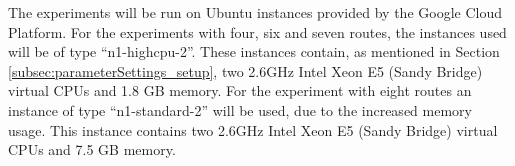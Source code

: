 The experiments will be run on Ubuntu instances provided by the Google Cloud Platform\citep{website:google}. For the experiments with four, six and seven routes, the instances used will be of type ``n1-highcpu-2''. These instances contain, as mentioned in Section \vref{subsec:parameterSettings_setup}, two 2.6GHz Intel Xeon E5 (Sandy Bridge) virtual CPUs and 1.8 GB memory. For the experiment with eight routes an instance of type ``n1-standard-2'' will be used, due to the increased memory usage. This instance contains two 2.6GHz Intel Xeon E5 (Sandy Bridge) virtual CPUs and 7.5 GB memory.

